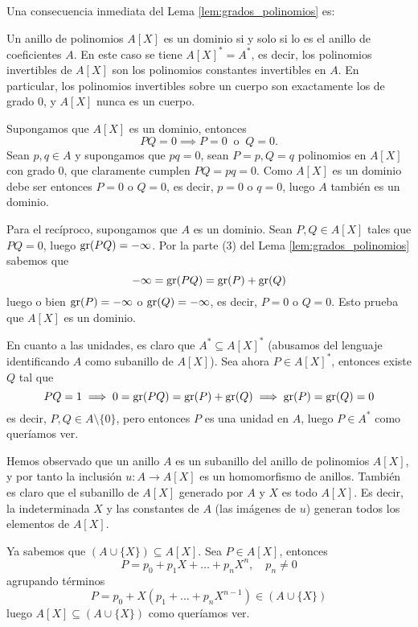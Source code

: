 Una consecuencia inmediata del Lema \ref{lem:grados_polinomios} es:

\begin{corollary}{}{}
Un anillo de polinomios \(A[X]\) es un dominio si y solo si lo es el anillo de coeficientes \(A\). En este caso se tiene \(A[X]^* = A^*\), es decir, los polinomios invertibles de \(A[X]\) son los polinomios constantes invertibles en \(A\). En particular, los polinomios invertibles sobre un cuerpo son exactamente los de grado 0, y \(A[X]\) nunca es un cuerpo.
\end{corollary}

\begin{proofbox}
Supongamos que \(A[X]\) es un dominio, entonces
\[
PQ = 0 \implies P = 0 ~\text{ o }~ Q = 0.
\]
Sean $p,q \in A$ y supongamos que $pq = 0$, sean $P = p, Q = q$ polinomios en $A[X]$ con grado 0, que claramente cumplen $PQ = pq = 0$. Como \(A[X]\) es un dominio debe ser entonces $P = 0$ o $Q = 0$, es decir, $p = 0$ o $q = 0$, luego \(A\) también es un dominio.

Para el recíproco, supongamos que \(A\) es un dominio. Sean $P,Q \in A[X]$ tales que $PQ = 0$, luego $\operatorname{gr}(PQ) = -\infty$. Por la parte (3) del Lema \ref{lem:grados_polinomios} sabemos que
\[
-\infty = \operatorname{gr}(PQ) = \operatorname{gr}(P) + \operatorname{gr}(Q)
\]
luego o bien \(\operatorname{gr}(P) = -\infty\) o \(\operatorname{gr}(Q) = - \infty\), es decir, $P = 0$ o $Q = 0$. Esto prueba que $A[X]$ es un dominio. 

En cuanto a las unidades, es claro que $A^* \subseteq A[X]^*$ (abusamos del lenguaje identificando $A$ como subanillo de $A[X]$). Sea ahora $P \in A[X]^*$, entonces existe $Q$ tal que
\[
PQ = 1 \implies 0 = \operatorname{gr}(PQ) = \operatorname{gr}(P) + \operatorname{gr}(Q) \implies \operatorname{gr}(P) = \operatorname{gr}(Q) = 0
\]
es decir, $P, Q \in A \setminus \{0\}$, pero entonces $P$ es una unidad en $A$, luego $P \in A^*$ como queríamos ver.
\end{proofbox}

Hemos observado que un anillo \(A\) es un subanillo del anillo de polinomios \(A[X]\), y por tanto la inclusión \(u : A \to A[X]\) es un homomorfismo de anillos. También es claro que el subanillo de \(A[X]\) generado por \(A\) y \(X\) es todo \(A[X]\). Es decir, la indeterminada \(X\) y las constantes de \(A\) (las imágenes de \(u\)) generan todos los elementos de \(A[X]\).

\begin{proofbox}
Ya sabemos que $(A \cup \{X\}) \subseteq A[X]$. Sea $P \in A[X]$, entonces
\[
P = p_0 + p_1 X + \dots + p_n X^n, \quad p_n \neq 0
\]
agrupando términos
\[
P = p_0 + X(p_1 + \dots + p_n X^{n-1}) \in (A \cup \{X\})
\]
luego $A[X] \subseteq (A \cup \{X\})$ como queríamos ver.
\end{proofbox}


